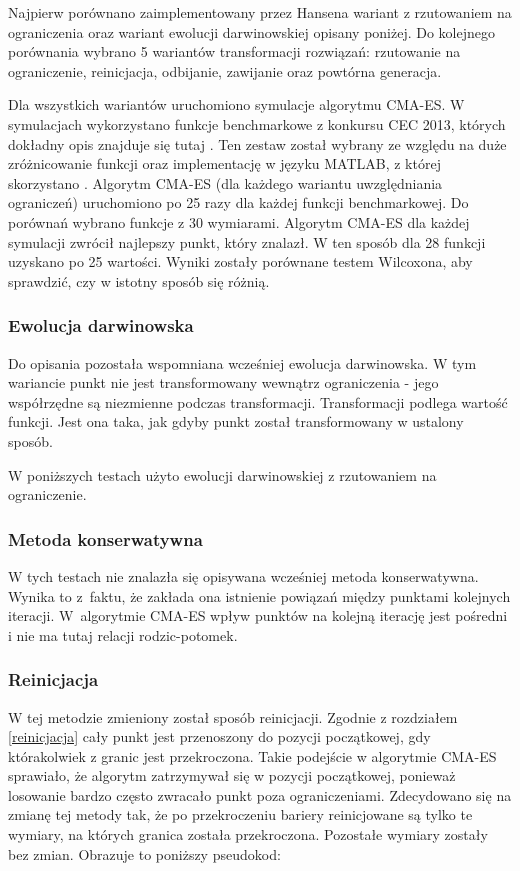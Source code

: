 \documentclass{mini}
\begin{document}
Najpierw porównano zaimplementowany przez Hansena wariant z rzutowaniem na ograniczenia oraz wariant ewolucji darwinowskiej opisany poniżej. Do kolejnego porównania wybrano 5 wariantów transformacji rozwiązań: rzutowanie na ograniczenie, reinicjacja, odbijanie, zawijanie oraz powtórna generacja.

Dla wszystkich wariantów uruchomiono symulacje algorytmu CMA-ES. W symulacjach wykorzystano funkcje benchmarkowe z konkursu CEC 2013, których dokładny opis znajduje się tutaj \cite{cec}. Ten zestaw został wybrany ze względu na duże zróżnicowanie funkcji oraz implementację w języku MATLAB, z której skorzystano \cite{cec_code}. Algorytm CMA-ES (dla każdego wariantu uwzględniania ograniczeń) uruchomiono po 25 razy dla każdej funkcji benchmarkowej. Do porównań wybrano funkcje z 30 wymiarami. Algorytm CMA-ES dla każdej symulacji zwrócił najlepszy punkt, który znalazł. W ten sposób dla 28 funkcji uzyskano po 25 wartości. Wyniki zostały porównane testem Wilcoxona, aby sprawdzić, czy w istotny sposób się różnią.

\subsubsection*{Ewolucja darwinowska}
\hspace{3,4ex}Do opisania pozostała wspomniana wcześniej ewolucja darwinowska. W tym wariancie punkt nie jest transformowany wewnątrz ograniczenia - jego współrzędne są niezmienne podczas transformacji. Transformacji podlega wartość funkcji. Jest ona taka, jak gdyby punkt został transformowany w ustalony sposób.

W poniższych testach użyto ewolucji darwinowskiej z rzutowaniem na ograniczenie.

\subsubsection*{Metoda konserwatywna}
\hspace{3,4ex}W tych testach nie znalazła się opisywana wcześniej metoda konserwatywna. Wynika to z~faktu, że zakłada ona istnienie powiązań między punktami kolejnych iteracji. W~algorytmie CMA-ES wpływ punktów na kolejną iterację jest pośredni i nie ma tutaj relacji rodzic-potomek.

\subsubsection*{Reinicjacja}
\hspace{3,4ex}W tej metodzie zmieniony został sposób reinicjacji. Zgodnie z rozdziałem \ref{reinicjacja} cały punkt jest przenoszony do pozycji początkowej, gdy którakolwiek z granic jest przekroczona. Takie podejście w algorytmie CMA-ES sprawiało, że algorytm zatrzymywał się w pozycji początkowej, ponieważ losowanie bardzo często zwracało punkt poza ograniczeniami. Zdecydowano się na zmianę tej metody tak, że po przekroczeniu bariery reinicjowane są tylko te wymiary, na których granica została przekroczona. Pozostałe wymiary zostały bez zmian. Obrazuje to poniższy pseudokod:
\end{document}
